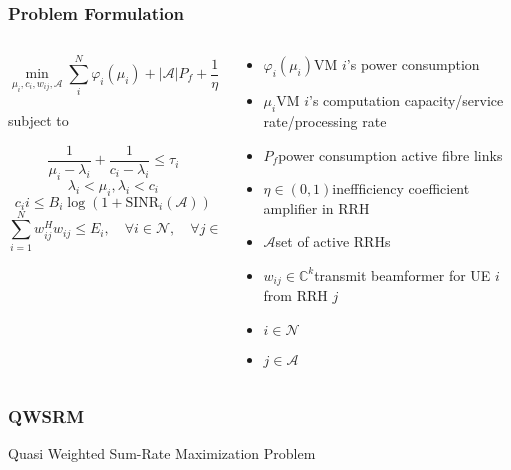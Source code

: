 \documentclass[usenames,dvipsnames]{beamer}
\begin{document}
\begin{frame}
  \frametitle{Problem Formulation}
  \vspace*{-2.5\baselineskip}
  \begin{columns}[t]
    \begin{column}{0.62\linewidth}
  \begin{exampleblock}{}
   \[
     \min_{\mu_{i},c_{i},w_{ij},\mathcal{A}}\sum_{i}^{N}\varphi_{i}(\mu_{i}) + \lvert\mathcal{A}\rvert P_{f} + \frac{1}{\eta}\sum_{i = 1}^{N}\sum_{j\in{A}}w_{ij}^{H}w_{ij}
   \]
  \end{exampleblock}
  subject to
  \begin{exampleblock}{}
    \[
      \frac{1}{\mu_{i}- \lambda_{i}} + \frac{1}{c_{i} - \lambda_{i}}\leq\tau_{i}
    \]
    \[
      \lambda_{i} < \mu_{i},\lambda_{i}<c_{i}
  \]
  \[
    c_i{i} \leq B_{i}\log(1+\text{SINR}_{i}(\mathcal{A}))
  \]
  \[
    \sum_{i=1}^{N}w_{ij}^{H}w_{ij}\leq E_{i},\quad \forall i\in \mathcal{N}, \quad \forall j\in \mathcal{L}
  \]
  \end{exampleblock}
\end{column}
\begin{column}{0.38\linewidth}
  \footnotesize\raggedright
  \begin{itemize}
    \item $\varphi_{i}(\mu_{i})$\quad VM $i$'s power consumption
    \item $\mu_{i}$\qquad VM $i$'s computation capacity/service rate/processing rate
    \item $P_{f}$\qquad power consumption active fibre links
    \item $\eta\in(0,1)$\quad ineffficiency coefficient amplifier in RRH
    \item $\mathcal{A}$\qquad set of active RRHs
    \item $w_{ij}\in\mathbb{C}^{k}$\quad transmit beamformer for UE $i$ from RRH $j$
    \item $i\in\mathcal{N}$
    \item $j\in\mathcal{A}$
  \end{itemize}
\end{column}
\end{columns}
\end{frame}
\begin{frame}
  \frametitle{QWSRM}
  \begin{exampleblock}{\phantom{Tp}}
    \centering Quasi Weighted Sum-Rate Maximization Problem
  \end{exampleblock}
\end{frame}
\end{document}

